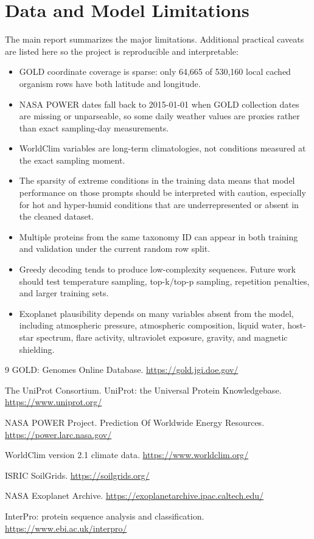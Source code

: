\documentclass[11pt]{article}
\begin{document}
\section{Data and Model Limitations}
The main report summarizes the major limitations. Additional practical caveats
are listed here so the project is reproducible and interpretable:
\begin{itemize}
  \item GOLD coordinate coverage is sparse: only 64,665 of 530,160 local cached
  organism rows have both latitude and longitude.
  \item NASA POWER dates fall back to 2015-01-01 when GOLD collection dates are
  missing or unparseable, so some daily weather values are proxies rather than
  exact sampling-day measurements.
  \item WorldClim variables are long-term climatologies, not conditions measured
  at the exact sampling moment.
  \item The sparsity of extreme conditions in the training data means that
  model performance on those prompts should be interpreted with caution, especially
  for hot and hyper-humid conditions that are underrepresented or absent in the
  cleaned dataset.
  \item Multiple proteins from the same taxonomy ID can appear in both training
  and validation under the current random row split.
  \item Greedy decoding tends to produce low-complexity sequences. Future work
  should test temperature sampling, top-k/top-p sampling, repetition penalties,
  and larger training sets.
  \item Exoplanet plausibility depends on many variables absent from the model,
  including atmospheric pressure, atmospheric composition, liquid water,
  host-star spectrum, flare activity, ultraviolet exposure, gravity, and
  magnetic shielding.
\end{itemize}

\begin{thebibliography}{9}
GOLD: Genomes Online Database. \url{https://gold.jgi.doe.gov/}

The UniProt Consortium. UniProt: the Universal Protein Knowledgebase.
\url{https://www.uniprot.org/}

NASA POWER Project. Prediction Of Worldwide Energy Resources.
\url{https://power.larc.nasa.gov/}

WorldClim version 2.1 climate data. \url{https://www.worldclim.org/}

ISRIC SoilGrids. \url{https://soilgrids.org/}

NASA Exoplanet Archive. \url{https://exoplanetarchive.ipac.caltech.edu/}

InterPro: protein sequence analysis and classification.
\url{https://www.ebi.ac.uk/interpro/}
\end{thebibliography}
\end{document}

